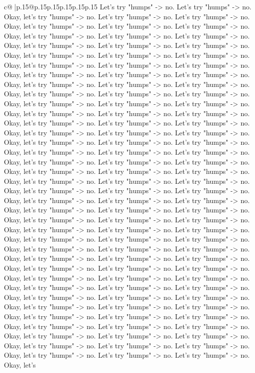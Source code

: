 \documentclass{article}
\begin{document}
{\begin{supertabular}{c@{$\;$}|p{.15\linewidth}@{}p{.15\linewidth}p{.15\linewidth}p{.15\linewidth}p{.15\linewidth}p{.15\linewidth}}
{{{Let's try "humps" {-}> no. Let's try "humps" {-}> no. Okay, let's try "humps" {-}> no. Let's try "humps" {-}> no. Let's try "humps" {-}> no. Okay, let's try "humps" {-}> no. Let's try "humps" {-}> no. Let's try "humps" {-}> no. Okay, let's try "humps" {-}> no. Let's try "humps" {-}> no. Let's try "humps" {-}> no. Okay, let's try "humps" {-}> no. Let's try "humps" {-}> no. Let's try "humps" {-}> no. Okay, let's try "humps" {-}> no. Let's try "humps" {-}> no. Let's try "humps" {-}> no. Okay, let's try "humps" {-}> no. Let's try "humps" {-}> no. Let's try "humps" {-}> no. Okay, let's try "humps" {-}> no. Let's try "humps" {-}> no. Let's try "humps" {-}> no. Okay, let's try "humps" {-}> no. Let's try "humps" {-}> no. Let's try "humps" {-}> no. Okay, let's try "humps" {-}> no. Let's try "humps" {-}> no. Let's try "humps" {-}> no. Okay, let's try "humps" {-}> no. Let's try "humps" {-}> no. Let's try "humps" {-}> no. Okay, let's try "humps" {-}> no. Let's try "humps" {-}> no. Let's try "humps" {-}> no. Okay, let's try "humps" {-}> no. Let's try "humps" {-}> no. Let's try "humps" {-}> no. Okay, let's try "humps" {-}> no. Let's try "humps" {-}> no. Let's try "humps" {-}> no. Okay, let's try "humps" {-}> no. Let's try "humps" {-}> no. Let's try "humps" {-}> no. Okay, let's try "humps" {-}> no. Let's try "humps" {-}> no. Let's try "humps" {-}> no. Okay, let's try "humps" {-}> no. Let's try "humps" {-}> no. Let's try "humps" {-}> no. Okay, let's try "humps" {-}> no. Let's try "humps" {-}> no. Let's try "humps" {-}> no. Okay, let's try "humps" {-}> no. Let's try "humps" {-}> no. Let's try "humps" {-}> no. Okay, let's try "humps" {-}> no. Let's try "humps" {-}> no. Let's try "humps" {-}> no. Okay, let's try "humps" {-}> no. Let's try "humps" {-}> no. Let's try "humps" {-}> no. Okay, let's try "humps" {-}> no. Let's try "humps" {-}> no. Let's try "humps" {-}> no. Okay, let's try "humps" {-}> no. Let's try "humps" {-}> no. Let's try "humps" {-}> no. Okay, let's try "humps" {-}> no. Let's try "humps" {-}> no. Let's try "humps" {-}> no. Okay, let's try "humps" {-}> no. Let's try "humps" {-}> no. Let's try "humps" {-}> no. Okay, let's try "humps" {-}> no. Let's try "humps" {-}> no. Let's try "humps" {-}> no. Okay, let's try "humps" {-}> no. Let's try "humps" {-}> no. Let's try "humps" {-}> no. Okay, let's try "humps" {-}> no. Let's try "humps" {-}> no. Let's try "humps" {-}> no. Okay, let's try "humps" {-}> no. Let's try "humps" {-}> no. Let's try "humps" {-}> no. Okay, let's try "humps" {-}> no. Let's try "humps" {-}> no. Let's try "humps" {-}> no. Okay, let's try "humps" {-}> no. Let's try "humps" {-}> no. Let's try "humps" {-}> no. Okay, let's try "humps" {-}> no. Let's try "humps" {-}> no. Let's try "humps" {-}> no. Okay, let's try "humps" {-}> no. Let's try "humps" {-}> no. Let's try "humps" {-}> no. Okay, let's try "humps" {-}> no. Let's try "humps" {-}> no. Let's try "humps" {-}> no. Okay, let's try "humps" {-}> no. Let's try "humps" {-}> no. Let's try "humps" {-}> no. Okay, let's try "humps" {-}> no. Let's try "humps" {-}> no. Let's try "humps" {-}> no. Okay, let's try "humps" {-}> no. Let's try "humps" {-}> no. Let's try "humps" {-}> no. Okay, let's }}}
\end{supertabular}}
\end{document}
